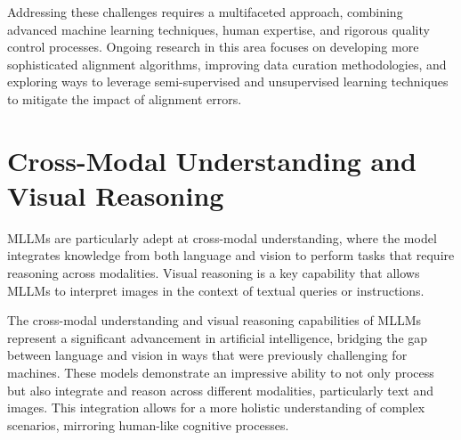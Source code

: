 Addressing these challenges requires a multifaceted approach, combining advanced machine learning techniques, human expertise, and rigorous quality control processes. Ongoing research in this area focuses on developing more sophisticated alignment algorithms, improving data curation methodologies, and exploring ways to leverage semi-supervised and unsupervised learning techniques to mitigate the impact of alignment errors.



\section{Cross-Modal Understanding and Visual Reasoning}

MLLMs are particularly adept at cross-modal understanding, where the model integrates knowledge from both language and vision to perform tasks that require reasoning across modalities. Visual reasoning is a key capability that allows MLLMs to interpret images in the context of textual queries or instructions.

The cross-modal understanding and visual reasoning capabilities of MLLMs represent a significant advancement in artificial intelligence, bridging the gap between language and vision in ways that were previously challenging for machines. These models demonstrate an impressive ability to not only process but also integrate and reason across different modalities, particularly text and images. This integration allows for a more holistic understanding of complex scenarios, mirroring human-like cognitive processes.

